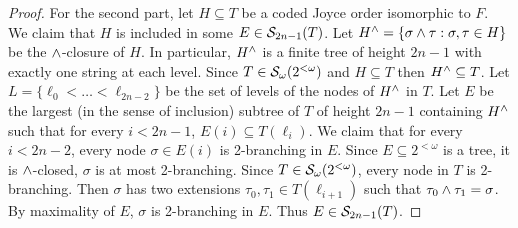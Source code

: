 \begin{proof}
For the second part, let $H \subseteq T$ be a coded Joyce order isomorphic to $F$. We claim that $H$ is included in some $E \in \mathcal{S}_{2n-1}({T})$.
Let $H^{\wedge} = \{\sigma \wedge \tau: \sigma, \tau \in H\}$ be the $\wedge$-closure of $H$.
In particular, $H^{\wedge}$ is a finite tree of height $2n-1$ with exactly one string at each level. Since $T \in \mathcal{S}_{\omega}({2^{<\omega}})$ and $H \subseteq T$ then $H^{\wedge} \subseteq T$. Let $L = \{\ell_0 < \dots < \ell_{2n-2}\}$ be the set of levels of the nodes of $H^{\wedge}$ in $T$. Let $E$ be the largest (in the sense of inclusion) subtree of $T$ of height $2n-1$ containing $H^{\wedge}$ such that for every $i < 2n-1$, $E(i) \subseteq T(\ell_i)$. We claim that for every $i < 2n-2$, every node $\sigma \in E(i)$ is 2-branching in $E$. Since $E \subseteq 2^{<\omega}$ is a tree, it is $\wedge$-closed, $\sigma$ is at most 2-branching. Since $T \in \mathcal{S}_{\omega}({2^{<\omega}})$, every node in $T$ is 2-branching. Then $\sigma$ has two extensions $\tau_0, \tau_1 \in T(\ell_{i+1})$ such that $\tau_0 \wedge \tau_1 = \sigma$. By maximality of $E$, $\sigma$ is 2-branching in $E$.
 	Thus $E \in \mathcal{S}_{2n-1}({T})$.
\end{proof}

